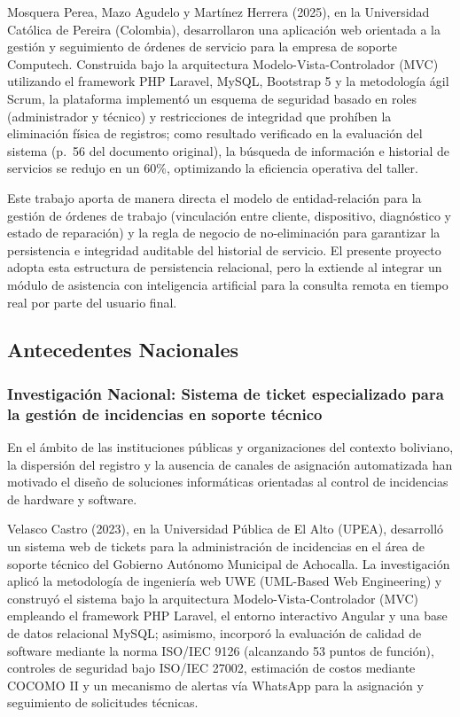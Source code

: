 Mosquera Perea, Mazo Agudelo y Martínez Herrera (2025), en la Universidad Católica de Pereira (Colombia), desarrollaron una aplicación web orientada a la gestión y seguimiento de órdenes de servicio para la empresa de soporte Computech. Construida bajo la arquitectura Modelo-Vista-Controlador (MVC) utilizando el framework PHP Laravel, MySQL, Bootstrap 5 y la metodología ágil Scrum, la plataforma implementó un esquema de seguridad basado en roles (administrador y técnico) y restricciones de integridad que prohíben la eliminación física de registros; como resultado verificado en la evaluación del sistema (p.~56 del documento original), la búsqueda de información e historial de servicios se redujo en un 60\%, optimizando la eficiencia operativa del taller.

Este trabajo aporta de manera directa el modelo de entidad-relación para la gestión de órdenes de trabajo (vinculación entre cliente, dispositivo, diagnóstico y estado de reparación) y la regla de negocio de no-eliminación para garantizar la persistencia e integridad auditable del historial de servicio. El presente proyecto adopta esta estructura de persistencia relacional, pero la extiende al integrar un módulo de asistencia con inteligencia artificial para la consulta remota en tiempo real por parte del usuario final.

\subsection{Antecedentes Nacionales}

\subsubsection*{Investigación Nacional: Sistema de ticket especializado para la gestión de incidencias en soporte técnico}

En el ámbito de las instituciones públicas y organizaciones del contexto boliviano, la dispersión del registro y la ausencia de canales de asignación automatizada han motivado el diseño de soluciones informáticas orientadas al control de incidencias de hardware y software.

Velasco Castro (2023), en la Universidad Pública de El Alto (UPEA), desarrolló un sistema web de tickets para la administración de incidencias en el área de soporte técnico del Gobierno Autónomo Municipal de Achocalla. La investigación aplicó la metodología de ingeniería web UWE (UML-Based Web Engineering) y construyó el sistema bajo la arquitectura Modelo-Vista-Controlador (MVC) empleando el framework PHP Laravel, el entorno interactivo Angular y una base de datos relacional MySQL; asimismo, incorporó la evaluación de calidad de software mediante la norma ISO/IEC 9126 (alcanzando 53 puntos de función), controles de seguridad bajo ISO/IEC 27002, estimación de costos mediante COCOMO II y un mecanismo de alertas vía WhatsApp para la asignación y seguimiento de solicitudes técnicas.

